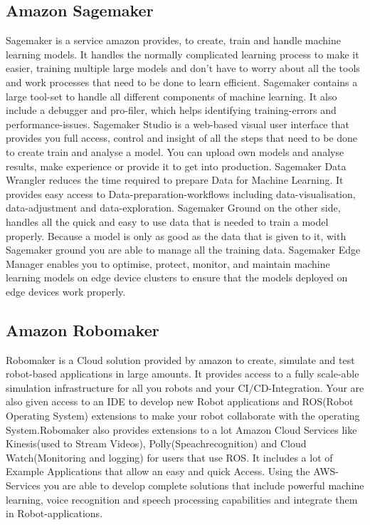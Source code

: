 \subsection{Amazon Sagemaker}
Sagemaker is a service amazon provides, to create, train and handle machine learning models. It handles the normally complicated  learning process to make it easier, training multiple large models and don't have to worry about all the tools and work processes that need to be done to learn efficient. Sagemaker contains a large tool-set to handle all different components of machine learning. It also include a debugger and pro-filer, which helps identifying training-errors and performance-issues.
\newline Sagemaker Studio is a web-based visual user interface that provides you full access, control and insight of all the steps that need to be done to create train and analyse a model. You can upload own models and analyse results, make experience or provide it to get into production. 
\newline Sagemaker Data Wrangler reduces the time required to prepare Data for Machine Learning. It provides easy access to Data-preparation-workflows including data-visualisation, data-adjustment and data-exploration.
\newline Sagemaker Ground on the other side, handles all the quick and easy to use data that is needed to train a model properly. Because a model is only as good as the data that is given to it, with Sagemaker ground you are able to manage all the training data.
\newline Sagemaker Edge Manager enables you to optimise, protect, monitor, and maintain machine learning models on edge device clusters to ensure that the models deployed on edge devices work properly.

\subsection{Amazon Robomaker}
Robomaker is a Cloud solution provided by amazon to create, simulate and test robot-based applications in large amounts. It provides access to a fully scale-able simulation infrastructure for all you robots and your CI/CD-Integration. Your are also given access to an IDE to develop new Robot applications and ROS(Robot Operating System) extensions to make your robot collaborate with the operating System.Robomaker also provides extensions to a lot Amazon Cloud Services like Kinesis(used to Stream Videos), Polly(Speachrecognition) and Cloud Watch(Monitoring and logging) for users that use ROS. It includes a lot of Example Applications that allow an easy and quick Access. Using the AWS-Services you are able to develop complete solutions that include powerful machine learning, voice recognition and speech processing capabilities and integrate them in Robot-applications.

